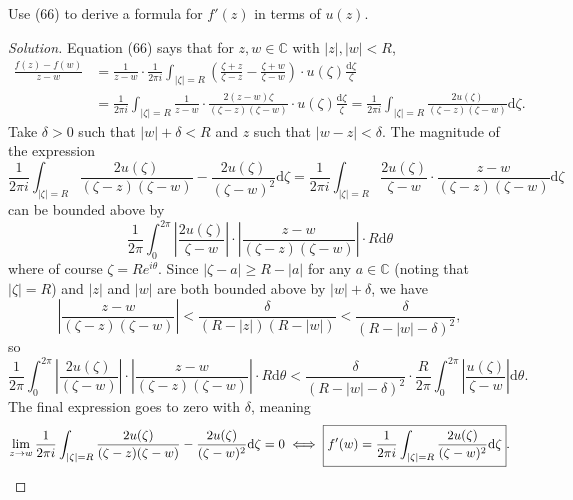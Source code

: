 \documentclass[10pt]{article}
\newcommand{\dd}{\mathrm{d}}
\providecommand{\CC}{\mathbb C}
\newenvironment{soln}{\begin{proof}[Solution]}{\end{proof}}
\providecommand{\abs}[1]{\left\lvert #1\right\rvert}
\providecommand{\paren}[1]{\left(#1\right)}
\begin{document}
\pagebreak
\begin{problem}
    [p.174\#4]
    Use (66) to derive a formula for $f'(z)$ in terms of $u(z)$.
\end{problem}

\begin{soln}
    Equation (66) says that for $z,w\in\CC$
    with $\abs z,\abs w < R$,
    \begin{align*}
	\frac{f(z)-f(w)}{z-w}
	&= \frac 1{z-w}\cdot\frac 1{2\pi i}\int_{\abs\zeta = R}
	\paren{\frac{\zeta+z}{\zeta-z}
	- \frac{\zeta+w}{\zeta-w}}\cdot u(\zeta)\frac{\dd\zeta}{\zeta}\\
	&= \frac 1{2\pi i}\int_{\abs\zeta = R}
	\frac 1{z-w}\cdot\frac{2(z-w)\zeta}{(\zeta-z)(\zeta-w)}
	\cdot u(\zeta)\frac{\dd\zeta}{\zeta}
	= \frac 1{2\pi i}\int_{\abs\zeta = R}
	\frac{2u(\zeta)}{(\zeta-z)(\zeta-w)}\dd\zeta.
    \end{align*}
    Take $\delta > 0$ such that $\abs w + \delta < R$
    and $z$ such that $\abs{w-z} < \delta$.
    The magnitude of the expression
    \begin{equation*}
	\frac 1{2\pi i}\int_{\abs\zeta = R}
	\frac{2u(\zeta)}{(\zeta-z)(\zeta-w)}
	-\frac{2u(\zeta)}{(\zeta-w)^2}\dd\zeta
	= \frac 1{2\pi i}\int_{\abs\zeta = R}
	\frac{2u(\zeta)}{\zeta-w}\cdot
	\frac{z-w}{(\zeta-z)(\zeta-w)}\dd\zeta
    \end{equation*}
    can be bounded above by
    \begin{equation*}
	\frac 1{2\pi}\int_0^{2\pi}\abs{\frac{2u(\zeta)}{\zeta-w}}
	\cdot \abs{\frac{z-w}{(\zeta-z)(\zeta-w)}}\cdot R\dd\theta
    \end{equation*}
    where of course $\zeta = Re^{i\theta}$.
    Since $\abs{\zeta-a} \ge R - \abs a$
    for any $a\in\CC$ (noting that $\abs\zeta = R$)
    and $\abs z$ and $\abs w$ are both bounded above by
    $\abs w + \delta$, we have
    \begin{equation*}
        \abs{\frac{z-w}{(\zeta-z)(\zeta-w)}}
	< \frac{\delta}{(R - \abs z)(R - \abs w)}
	< \frac{\delta}{(R - \abs w - \delta)^2},
    \end{equation*}
    so
    \begin{equation*}
	\frac 1{2\pi}\int_0^{2\pi}\abs{\frac{2u(\zeta)}{(\zeta-w)}}
	\cdot \abs{\frac{z-w}{(\zeta-z)(\zeta-w)}}\cdot R\dd\theta
	< \frac{\delta}{(R - \abs w - \delta)^2}
	\cdot \frac R{2\pi}\int_0^{2\pi}
	\abs{\frac{u(\zeta)}{\zeta-w}}\dd\theta.
    \end{equation*}
    The final expression goes to zero with $\delta$, meaning
    \begin{equation*}
	\lim_{z\to w}\frac 1{2\pi i}\int_{\abs\zeta = R}
	\frac{2u(\zeta)}{(\zeta-z)(\zeta-w)}
	-\frac{2u(\zeta)}{(\zeta-w)^2}\dd\zeta = 0
	\iff \boxed{f'(w) = \frac 1{2\pi i}\int_{\abs\zeta = R}
	\frac{2 u(\zeta)}{(\zeta-w)^2}\dd\zeta}.\qedhere
    \end{equation*}
\end{soln}
\end{document}
